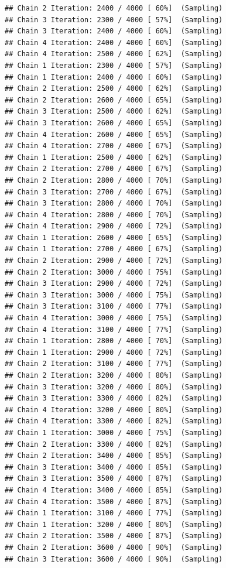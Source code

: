 \documentclass[
]{article}
\begin{document}
\begin{verbatim}
## Chain 2 Iteration: 2400 / 4000 [ 60%]  (Sampling) 
## Chain 3 Iteration: 2300 / 4000 [ 57%]  (Sampling) 
## Chain 3 Iteration: 2400 / 4000 [ 60%]  (Sampling) 
## Chain 4 Iteration: 2400 / 4000 [ 60%]  (Sampling) 
## Chain 4 Iteration: 2500 / 4000 [ 62%]  (Sampling) 
## Chain 1 Iteration: 2300 / 4000 [ 57%]  (Sampling) 
## Chain 1 Iteration: 2400 / 4000 [ 60%]  (Sampling) 
## Chain 2 Iteration: 2500 / 4000 [ 62%]  (Sampling) 
## Chain 2 Iteration: 2600 / 4000 [ 65%]  (Sampling) 
## Chain 3 Iteration: 2500 / 4000 [ 62%]  (Sampling) 
## Chain 3 Iteration: 2600 / 4000 [ 65%]  (Sampling) 
## Chain 4 Iteration: 2600 / 4000 [ 65%]  (Sampling) 
## Chain 4 Iteration: 2700 / 4000 [ 67%]  (Sampling) 
## Chain 1 Iteration: 2500 / 4000 [ 62%]  (Sampling) 
## Chain 2 Iteration: 2700 / 4000 [ 67%]  (Sampling) 
## Chain 2 Iteration: 2800 / 4000 [ 70%]  (Sampling) 
## Chain 3 Iteration: 2700 / 4000 [ 67%]  (Sampling) 
## Chain 3 Iteration: 2800 / 4000 [ 70%]  (Sampling) 
## Chain 4 Iteration: 2800 / 4000 [ 70%]  (Sampling) 
## Chain 4 Iteration: 2900 / 4000 [ 72%]  (Sampling) 
## Chain 1 Iteration: 2600 / 4000 [ 65%]  (Sampling) 
## Chain 1 Iteration: 2700 / 4000 [ 67%]  (Sampling) 
## Chain 2 Iteration: 2900 / 4000 [ 72%]  (Sampling) 
## Chain 2 Iteration: 3000 / 4000 [ 75%]  (Sampling) 
## Chain 3 Iteration: 2900 / 4000 [ 72%]  (Sampling) 
## Chain 3 Iteration: 3000 / 4000 [ 75%]  (Sampling) 
## Chain 3 Iteration: 3100 / 4000 [ 77%]  (Sampling) 
## Chain 4 Iteration: 3000 / 4000 [ 75%]  (Sampling) 
## Chain 4 Iteration: 3100 / 4000 [ 77%]  (Sampling) 
## Chain 1 Iteration: 2800 / 4000 [ 70%]  (Sampling) 
## Chain 1 Iteration: 2900 / 4000 [ 72%]  (Sampling) 
## Chain 2 Iteration: 3100 / 4000 [ 77%]  (Sampling) 
## Chain 2 Iteration: 3200 / 4000 [ 80%]  (Sampling) 
## Chain 3 Iteration: 3200 / 4000 [ 80%]  (Sampling) 
## Chain 3 Iteration: 3300 / 4000 [ 82%]  (Sampling) 
## Chain 4 Iteration: 3200 / 4000 [ 80%]  (Sampling) 
## Chain 4 Iteration: 3300 / 4000 [ 82%]  (Sampling) 
## Chain 1 Iteration: 3000 / 4000 [ 75%]  (Sampling) 
## Chain 2 Iteration: 3300 / 4000 [ 82%]  (Sampling) 
## Chain 2 Iteration: 3400 / 4000 [ 85%]  (Sampling) 
## Chain 3 Iteration: 3400 / 4000 [ 85%]  (Sampling) 
## Chain 3 Iteration: 3500 / 4000 [ 87%]  (Sampling) 
## Chain 4 Iteration: 3400 / 4000 [ 85%]  (Sampling) 
## Chain 4 Iteration: 3500 / 4000 [ 87%]  (Sampling) 
## Chain 1 Iteration: 3100 / 4000 [ 77%]  (Sampling) 
## Chain 1 Iteration: 3200 / 4000 [ 80%]  (Sampling) 
## Chain 2 Iteration: 3500 / 4000 [ 87%]  (Sampling) 
## Chain 2 Iteration: 3600 / 4000 [ 90%]  (Sampling) 
## Chain 3 Iteration: 3600 / 4000 [ 90%]  (Sampling) 

\end{verbatim}
\end{document}
